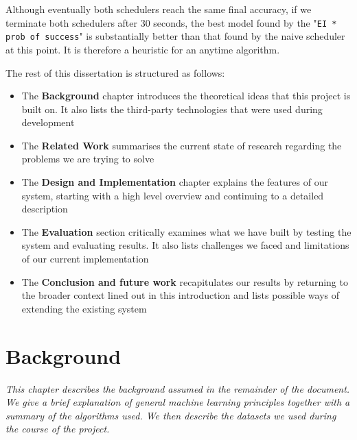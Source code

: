 \documentclass[a4paper,12pt,twoside,openright]{report}
\begin{document}
Although eventually both schedulers reach the same final accuracy, if we terminate both schedulers after 30 seconds, the best model found by the "\texttt{EI * prob of success}" is substantially better than that found by the naive scheduler at this point. It is therefore a heuristic for an anytime algorithm.









The rest of this dissertation is structured as follows:
\begin{itemize}
	\item The \textbf{Background} chapter introduces the theoretical ideas that this project is built on. It also lists the third-party technologies that were used during development
	\item The \textbf{Related Work} summarises the current state of research regarding the problems we are trying to solve
	\item The \textbf{Design and Implementation} chapter explains the features of our system, starting with a high level overview and continuing to a detailed description
	\item The \textbf{Evaluation} section critically examines what we have built by testing the system and evaluating results. It also lists challenges we faced and limitations of our current implementation
	\item The \textbf{Conclusion and future work} recapitulates our results by returning to the broader context lined out in this introduction and lists possible ways of extending the existing system
\end{itemize}












\chapter{Background}
\textit{This chapter describes the background assumed in the remainder of the document. We give a brief explanation of general machine learning principles together with a summary of the algorithms used. We then describe the datasets we used during the course of the project.}
\end{document}
